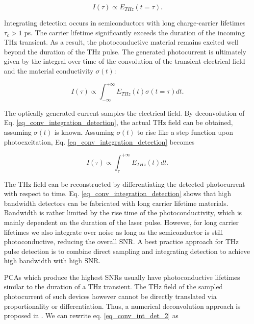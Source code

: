 \begin{equation}
	I(\tau) \propto E_{THz}(t=\tau).
\end{equation}

Integrating detection occurs in semiconductors with long charge-carrier lifetimes $\tau_c > 1$ \si{\pico \s}. The carrier lifetime significantly exceeds the duration of the incoming THz transient. As a result, the photoconductive material remains excited well beyond the duration of the THz pulse. The generated photocurrent is ultimately given by the integral over time of the convolution of the transient electrical field and the material conductivity $\sigma(t)$:

\begin{equation}
	I(\tau) \propto \int_{-\infty}^{+\infty} E_{THz}(t)\sigma(t = \tau)dt.
	\label{eq_conv_integration_detection}
\end{equation}

The optically generated current samples the electrical field. 
By deconvolution of Eq. \ref{eq_conv_integration_detection}, the actual THz field can be obtained, assuming $\sigma(t)$ is known. Assuming $\sigma(t)$ to rise like a step function upon photoexcitation, Eq. \ref{eq_conv_integration_detection} becomes 

\begin{equation}
	I(\tau) \propto  \int_{\tau}^{+\infty} E_{THz}(t)dt.
	\label{eq_conv_int_det_2}
\end{equation}

The THz field can be reconstructed by differentiating the detected photocurrent with respect to time. Eq. \ref{eq_conv_integration_detection} shows that high bandwidth detectors can be fabricated with long carrier lifetime materials. Bandwidth is rather limited by the rise time of the photoconductivity, which is mainly dependent on the duration of the laser pulse. However, for long carrier lifetimes we also integrate over noise as long as the semiconductor is still photoconductive, reducing the overall SNR. A best practice approach for THz pulse detection is to combine direct sampling and integrating detection to achieve high bandwidth with high SNR. 

PCAs which produce the highest SNRs usually have photoconductive lifetimes similar to the duration of a THz transient. The THz field of the sampled photocurrent of such devices however cannot be directly translated via proportionality or differentiation. Thus, a numerical deconvolution approach is proposed in \cite{castro-camusPhotoconductiveResponseCorrection2008}. We can rewrite eq. \ref{eq_conv_int_det_2} as 

